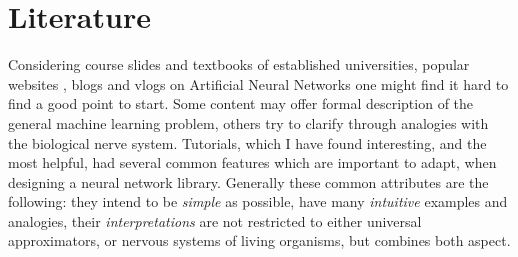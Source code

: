 \chapter{Literature}


Considering course slides \cite{stanfordlectures, oxfordlectures} and textbooks \cite{Goodfellow-et-al-2016-Book, werbos1994roots} of established universities, popular websites \cite{deeplearningdotnet, pedregosa2011scikit}, blogs \cite{gibiansky, karpathyblog} and vlogs \cite{vlog1} on Artificial Neural Networks one might find it hard to find a good point to start. 
Some content may offer formal description of the general machine learning problem, others try to clarify through analogies with the biological nerve system.
Tutorials, which I have found interesting, and the most helpful, had several common features which are important to adapt, when designing a neural network library. 
Generally these common attributes are the following: 
they intend to be \emph{simple} as possible, 
have many \emph{intuitive} examples and analogies,
their \emph{interpretations} are not restricted to either universal approximators, or nervous systems of living organisms, but combines both aspect.
